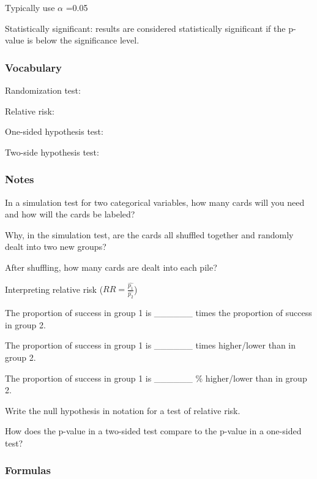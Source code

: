 \documentclass[
]{report}
\newcommand{\rgs}{\vspace{12pt}} %
\newcommand{\rgi}{\hspace{24pt}}  %
\begin{document}
\rgi Typically use \(\alpha\) =0.05

Statistically significant: results are considered statistically significant if the p-value is below the significance level.

\hypertarget{vocabulary-15}{%
\subsubsection*{Vocabulary}\label{vocabulary-15}}

Randomization test:
\rgs

Relative risk:
\rgs

One-sided hypothesis test:
\rgs

Two-side hypothesis test:
\rgs

\hypertarget{notes-19}{%
\subsubsection*{Notes}\label{notes-19}}

In a simulation test for two categorical variables, how many cards will you need and how will the cards be labeled?
\rgs

Why, in the simulation test, are the cards all shuffled together and randomly dealt into two new groups?
\rgs

After shuffling, how many cards are dealt into each pile?
\rgs

Interpreting relative risk (\(RR = \frac{\hat{p_1}}{\hat{p_2}}\))

\rgi The proportion of success in group 1 is \_\_\_\_\_\_ times the proportion of success in group 2.

\rgi The proportion of success in group 1 is \_\_\_\_\_\_ times higher/lower than in group 2.

\rgi The proportion of success in group 1 is \_\_\_\_\_\_ \% higher/lower than in group 2.

Write the null hypothesis in notation for a test of relative risk.
\rgs

How does the p-value in a two-sided test compare to the p-value in a one-sided test?
\rgs

\hypertarget{formulas-5}{%
\subsubsection*{Formulas}\label{formulas-5}}
\end{document}
